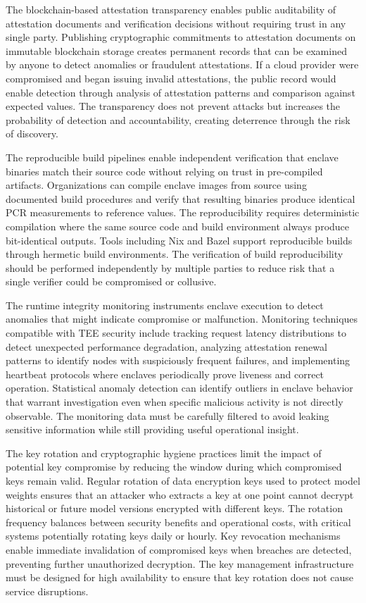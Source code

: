 The blockchain-based attestation transparency enables public auditability of attestation documents and verification decisions without requiring trust in any single party. Publishing cryptographic commitments to attestation documents on immutable blockchain storage creates permanent records that can be examined by anyone to detect anomalies or fraudulent attestations. If a cloud provider were compromised and began issuing invalid attestations, the public record would enable detection through analysis of attestation patterns and comparison against expected values. The transparency does not prevent attacks but increases the probability of detection and accountability, creating deterrence through the risk of discovery.

The reproducible build pipelines enable independent verification that enclave binaries match their source code without relying on trust in pre-compiled artifacts. Organizations can compile enclave images from source using documented build procedures and verify that resulting binaries produce identical PCR measurements to reference values. The reproducibility requires deterministic compilation where the same source code and build environment always produce bit-identical outputs. Tools including Nix and Bazel support reproducible builds through hermetic build environments. The verification of build reproducibility should be performed independently by multiple parties to reduce risk that a single verifier could be compromised or collusive.

The runtime integrity monitoring instruments enclave execution to detect anomalies that might indicate compromise or malfunction. Monitoring techniques compatible with TEE security include tracking request latency distributions to detect unexpected performance degradation, analyzing attestation renewal patterns to identify nodes with suspiciously frequent failures, and implementing heartbeat protocols where enclaves periodically prove liveness and correct operation. Statistical anomaly detection can identify outliers in enclave behavior that warrant investigation even when specific malicious activity is not directly observable. The monitoring data must be carefully filtered to avoid leaking sensitive information while still providing useful operational insight.

The key rotation and cryptographic hygiene practices limit the impact of potential key compromise by reducing the window during which compromised keys remain valid. Regular rotation of data encryption keys used to protect model weights ensures that an attacker who extracts a key at one point cannot decrypt historical or future model versions encrypted with different keys. The rotation frequency balances between security benefits and operational costs, with critical systems potentially rotating keys daily or hourly. Key revocation mechanisms enable immediate invalidation of compromised keys when breaches are detected, preventing further unauthorized decryption. The key management infrastructure must be designed for high availability to ensure that key rotation does not cause service disruptions.


